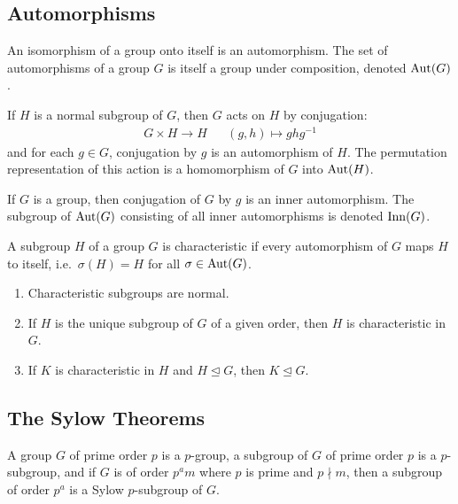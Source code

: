 \documentclass[a5paper]{article}
\begin{document}
\subsection{Automorphisms}

\begin{definition}
	An isomorphism of a group onto itself is an automorphism. The set of
  automorphisms of a group $G$ is itself a group under composition, denoted
  $\operatorname{Aut}(G)$.
\end{definition}

\begin{theorem}
  If $H$ is a normal subgroup of $G$, then $G$ acts on $H$ by conjugation:
  \begin{align*}
    G\times H\longrightarrow H && (g,h)\longmapsto ghg^{-1}
  \end{align*}
  and for each $g\in G$, conjugation by $g$ is an automorphism of $H$. The
  permutation representation of this action is a homomorphism of $G$ into
  $\operatorname{Aut}(H)$.
\end{theorem}

\begin{definition}
	If $G$ is a group, then conjugation of $G$ by $g$ is an inner automorphism.
  The subgroup of $\operatorname{Aut}(G)$ consisting of all inner automorphisms is denoted
  $\operatorname{Inn}(G)$.
\end{definition}

\begin{definition}
  A subgroup $H$ of a group $G$ is characteristic if every automorphism of $G$
  maps $H$ to itself, i.e.\ $\sigma(H)=H$ for all $\sigma\in\operatorname{Aut}(G)$.
\end{definition}

\begin{theorem}
  \begin{enumerate}%
    \item Characteristic subgroups are normal.
    \item If $H$ is the unique subgroup of $G$ of a given order, then $H$ is
      characteristic in $G$.
    \item If $K$ is characteristic in $H$ and $H\trianglelefteq G$, then
      $K\trianglelefteq G$.
  \end{enumerate}
\end{theorem}

\subsection{The Sylow Theorems}
\begin{definition}
	A group $G$ of prime order $p$ is a $p$-group, a subgroup of $G$ of prime
  order $p$ is a $p$-subgroup, and if $G$ is of order $p^am$ where $p$ is prime
  and $p\nmid m$, then a subgroup of order $p^a$ is a Sylow $p$-subgroup of $G$.
\end{definition}
\end{document}
